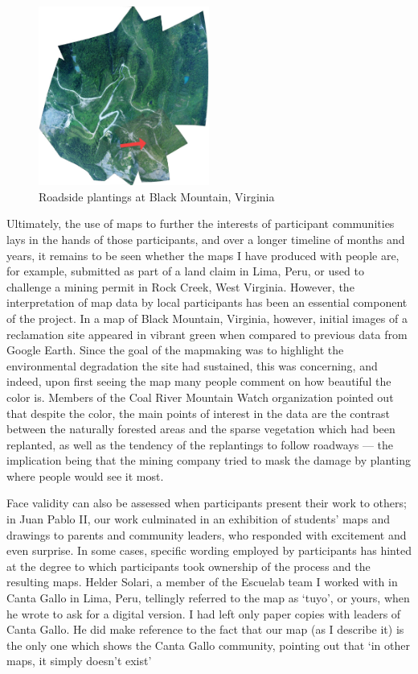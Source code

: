 \documentclass[11pt,oneside,notitlepage]{report}
\begin{document}
\begin{figure}
  \begin{flushright}
	\includegraphics[width=0.5\textwidth]{images/black-mountain.jpg}
	\caption{Roadside plantings at Black Mountain, Virginia}
  \end{flushright}
\end{figure}

Ultimately, the use of maps to further the interests of participant communities lays in the hands of those participants, and over a longer timeline of months and years, it remains to be seen whether the maps I have produced with people are, for example, submitted as part of a land claim in Lima, Peru, or used to challenge a mining permit in Rock Creek, West Virginia. However, the interpretation of map data by local participants has been an essential component of the project. In a map of Black Mountain, Virginia, however, initial images of a reclamation site appeared in vibrant green when compared to previous data from Google Earth. Since the goal of the mapmaking was to highlight the environmental degradation the site had sustained, this was concerning, and indeed, upon first seeing the map many people comment on how beautiful the color is. Members of the Coal River Mountain Watch organization pointed out that despite the color, the main points of interest in the data are the contrast between the naturally forested areas and the sparse vegetation which had been replanted, as well as the tendency of the replantings to follow roadways --- the implication being that the mining company tried to mask the damage by planting where people would see it most.  

Face validity can also be assessed when participants present their work to others; in Juan Pablo II, our work culminated in an exhibition of students' maps and drawings to parents and community leaders, who responded with excitement and even surprise. In some cases, specific wording employed by participants has hinted at the degree to which participants took ownership of the process and the resulting maps. Helder Solari, a member of the Escuelab team I worked with in Canta Gallo in Lima, Peru, tellingly referred to the map as `tuyo', or yours, when he wrote to ask for a digital version. I had left only paper copies with leaders of Canta Gallo. He did make reference to the fact that our map (as I describe it) is the only one which shows the Canta Gallo community, pointing out that `in other maps, it simply doesn't exist' \cite{solari2010cantagallo}
\end{document}
